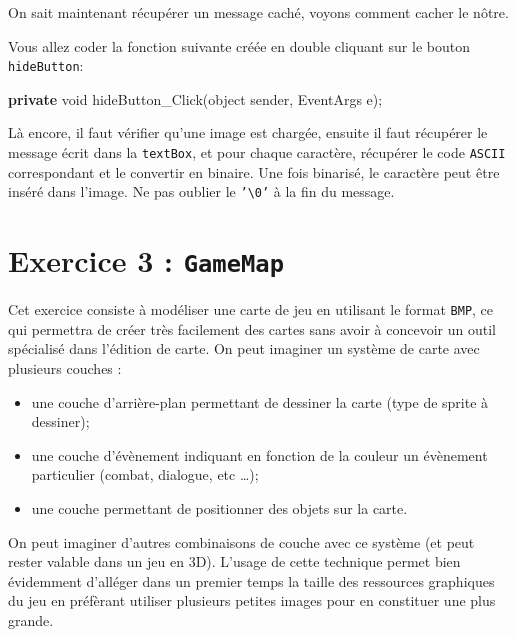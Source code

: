 \documentclass[11pt, a4paper]{article}
\newenvironment{Shaded}{}{}
\newcommand{\KeywordTok}[1]{\textcolor[rgb]{0.00,0.44,0.13}{\textbf{{#1}}}}
\newcommand{\DataTypeTok}[1]{\textcolor[rgb]{0.56,0.13,0.00}{{#1}}}
\newcommand{\FunctionTok}[1]{\textcolor[rgb]{0.02,0.16,0.49}{{#1}}}
\newcommand{\NormalTok}[1]{{#1}}
\begin{document}
On sait maintenant récupérer un message caché, voyons comment cacher le
nôtre.

Vous allez coder la fonction suivante créée en double cliquant sur le
bouton \texttt{hideButton}:

\begin{Shaded}
\begin{Highlighting}[]
\KeywordTok{private} \DataTypeTok{void} \FunctionTok{hideButton_Click}\NormalTok{(}\DataTypeTok{object} \NormalTok{sender, EventArgs e);}
\end{Highlighting}
\end{Shaded}

Là encore, il faut vérifier qu'une image est chargée, ensuite il faut
récupérer le message écrit dans la \texttt{textBox}, et pour chaque
caractère, récupérer le code \texttt{ASCII} correspondant et le
convertir en binaire. Une fois binarisé, le caractère peut être inséré
dans l'image. Ne pas oublier le \texttt{'\textbackslash{}0'} à la fin du
message.
\section{Exercice 3 : \texttt{GameMap}}\label{exercice-3-gamemap}

Cet exercice consiste à modéliser une carte de jeu en utilisant le
format \texttt{BMP}, ce qui permettra de créer très facilement des
cartes sans avoir à concevoir un outil spécialisé dans l'édition de
carte. On peut imaginer un système de carte avec plusieurs couches :

\begin{itemize}
\itemsep1pt\parskip0pt
\item
  une couche d'arrière-plan permettant de dessiner la carte (type de
  sprite à dessiner);
\item
  une couche d'évènement indiquant en fonction de la couleur un
  évènement particulier (combat, dialogue, etc \ldots{});
\item
  une couche permettant de positionner des objets sur la carte.\newline
\end{itemize}

On peut imaginer d'autres combinaisons de couche avec ce système (et
peut rester valable dans un jeu en 3D). L'usage de cette technique
permet bien évidemment d'alléger dans un premier temps la taille des
ressources graphiques du jeu en préfèrant utiliser plusieurs petites
images pour en constituer une plus grande.
\end{document}
